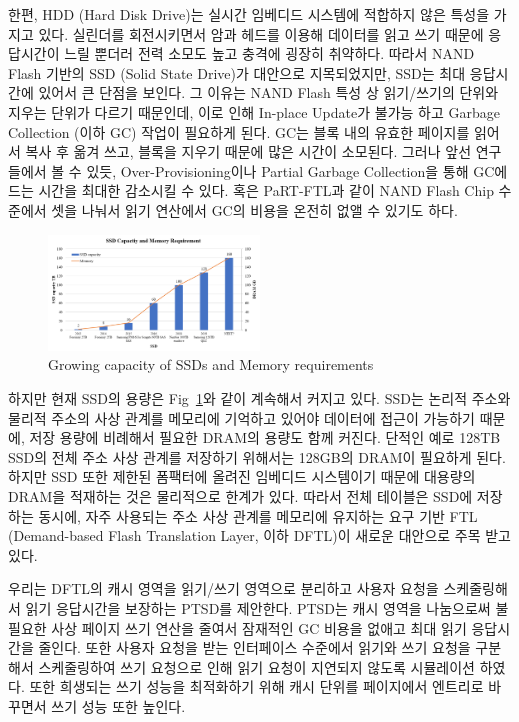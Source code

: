 \documentclass[conference]{IEEEtran}
\begin{document}
한편, HDD (Hard Disk Drive)는 실시간 임베디드 시스템에 적합하지 않은 특성을 가지고 있다. 실린더를 회전시키면서
암과 헤드를 이용해 데이터를 읽고 쓰기 때문에 응답시간이 느릴 뿐더러 전력 소모도 높고 충격에 굉장히 취약하다.
따라서 NAND Flash 기반의 SSD (Solid State Drive)가 대안으로 지목되었지만, SSD는 최대 응답시간에 있어서
큰 단점을 보인다. 그 이유는 NAND Flash 특성 상 읽기/쓰기의 단위와 지우는 단위가 다르기 때문인데,
이로 인해 In-place Update가 불가능 하고 Garbage Collection (이하 GC) 작업이 필요하게 된다.
GC는 블록 내의 유효한 페이지를 읽어서 복사 후 옮겨 쓰고, 블록을 지우기 때문에 많은 시간이 소모된다.
그러나 앞선 연구들에서 볼 수 있듯, Over-Provisioning이나 Partial Garbage Collection을 통해 
GC에 드는 시간을 최대한 감소시킬 수 있다. 혹은 PaRT-FTL과 같이 NAND Flash Chip 수준에서 셋을 나눠서
읽기 연산에서 GC의 비용을 온전히 없앨 수 있기도 하다. \par

\begin{figure}[t]
	\centering
	\includegraphics[width=0.5\textwidth]{image/intro/ssd_size.png}
	\caption{Growing capacity of SSDs and Memory requirements}
	\label{fig:SSD_size}
\end{figure}

하지만 현재 SSD의 용량은 Fig~\ref{fig:SSD_size}와 같이 계속해서 커지고 있다. SSD는 논리적 주소와 물리적 주소의
사상 관계를 메모리에 기억하고 있어야 데이터에 접근이 가능하기 때문에, 저장 용량에 비례해서 필요한 DRAM의 용량도
함께 커진다. 단적인 예로 128TB SSD의 전체 주소 사상 관계를 저장하기 위해서는 128GB의 DRAM이 필요하게 된다.
하지만 SSD 또한 제한된 폼팩터에 올려진 임베디드 시스템이기 때문에 대용량의 DRAM을 적재하는 것은 물리적으로 한계가 있다.
따라서 전체 테이블은 SSD에 저장하는 동시에, 자주 사용되는 주소 사상 관계를 메모리에 유지하는 요구 기반 FTL
(Demand-based Flash Translation Layer, 이하 DFTL)이 새로운 대안으로 주목 받고 있다. \par

우리는 DFTL의 캐시 영역을 읽기/쓰기 영역으로 분리하고 사용자 요청을 스케줄링해서 읽기 응답시간을 보장하는
PTSD를 제안한다. PTSD는 캐시 영역을 나눔으로써 불필요한 사상 페이지 쓰기 연산을 줄여서 잠재적인 GC 비용을 없애고
최대 읽기 응답시간을 줄인다. 또한 사용자 요청을 받는 인터페이스 수준에서 읽기와 쓰기 요청을 구분해서 스케줄링하여
쓰기 요청으로 인해 읽기 요청이 지연되지 않도록 시뮬레이션 하였다. 또한 희생되는 쓰기 성능을 최적화하기 위해
캐시 단위를 페이지에서 엔트리로 바꾸면서 쓰기 성능 또한 높인다. \par
\end{document}
